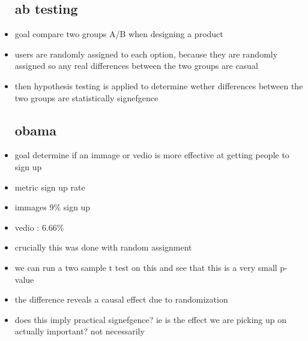 \documentclass{article}
\begin{document}
\begin{itemize}
\subsection*{ab testing}
\item goal compare two groups A/B when designing a product 
\item users are randomly assigned to each option, because they are randomly assigned so any real differences between the two groups are casual 
\item then hypothesis testing is applied to determine wether differences between the two groups are statistically signefgence
\subsection*{obama}
\item goal determine if an immage or vedio is more effective at getting people to sign up 
\item metric sign up rate 
\item immages 9\% sign up 
\item vedio : 6.66\%
\item crucially this was done with random assignment
\item we can run a two sample t test on this and see that this is a very small p-value 
\item the difference reveals a causal effect due to randomization
\item does this imply practical signefgence? ie is the effect we are picking up on actually important? not necessarily 



\end{itemize}
\end{document}
